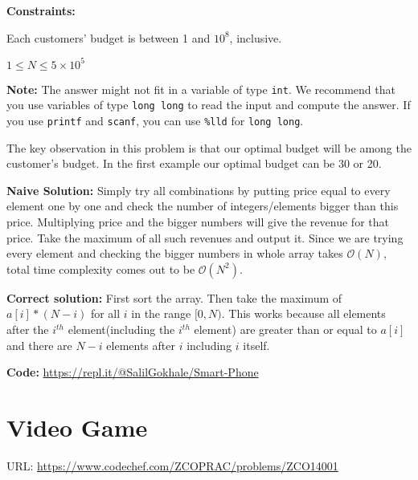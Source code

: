 \documentclass[twoside,12pt,a4paper,english]{book}
\theoremstyle{definition}
\theoremstyle{problemstyle}
\theoremstyle{problemstyle}
\theoremstyle{problemstyle}
\begin{document}
\textbf{Constraints:}
\begin{center}
    Each customers' budget is between 1 and $10^8$, inclusive.
    
    $1 \leq N \leq 5\times 10^5$
\end{center}

\textbf{Note:} The answer might not fit in a variable of type \texttt{int}. We recommend that you use variables of type \texttt{long long} to read the input and compute the answer. If you use \texttt{printf} and \texttt{scanf}, you can use \texttt{\%lld} for \texttt{long long}.

\begin{tcolorbox}[title=Solution]

The key observation in this problem is that our optimal budget will be among the customer's budget. In the first example our optimal budget can be 30 or 20.

\vspace{6mm}

\textbf{Naive Solution:} Simply try all combinations by putting price equal to every element one by one and check the number of integers/elements bigger than this price. Multiplying price and the bigger numbers will give the revenue for that price. Take the maximum of all such revenues and output it. Since we are trying every element and checking the bigger numbers in whole array takes $\mathcal{O}(N)$, total time complexity comes out to be $\mathcal{O}(N^2)$.

\vspace{6mm}

\textbf{Correct solution:} First sort the array. Then take the maximum of $a[i]*(N-i)$ for all $i$ in the range $[0,N)$. This works because all elements after the $i^{th}$ element(including the $i^{th}$ element) are greater than or equal to $a[i]$ and there are $N-i$ elements after $i$ including $i$ itself.

\vspace{6mm}

\textbf{Code: } \url{https://repl.it/@SalilGokhale/Smart-Phone}

\end{tcolorbox}

\newpage

\section{Video Game}

URL: \url{https://www.codechef.com/ZCOPRAC/problems/ZCO14001}
\end{document}
